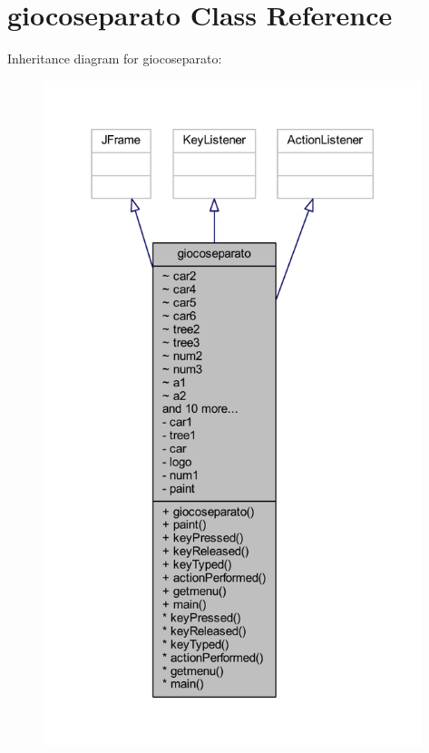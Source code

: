 \hypertarget{classcargame_1_1giocoseparato}{}\section{giocoseparato Class Reference}
\label{classcargame_1_1giocoseparato}


Inheritance diagram for giocoseparato\+:
\nopagebreak
\begin{figure}[H]
\begin{center}
\leavevmode
\includegraphics[height=550pt]{classcargame_1_1giocoseparato__inherit__graph}
\end{center}
\end{figure}


